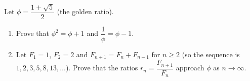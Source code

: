 Let $\phi=\dfrac{1+\sqrt5}{2}$ (the golden ratio).
\begin{enumerate}
\item[(a)] Prove that $\phi^2=\phi+1$ and $\dfrac1\phi=\phi-1$.
\item[(b)] Let $F_1=1$, $F_2=2$ and $F_{n+1}=F_n+F_{n-1}$ for $n\ge2$ (so the sequence is $1,2,3,5,8,13,\ldots$). Prove that the ratios $r_n=\dfrac{F_{n+1}}{F_n}$ approach $\phi$ as $n\to\infty$.
\end{enumerate}
